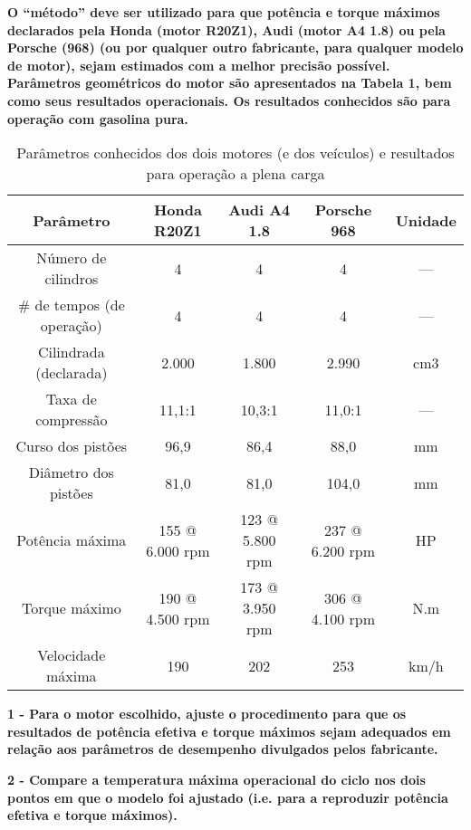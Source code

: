 \documentclass[a4paper]{article}
\begin{document}
\textbf{O “método” deve ser utilizado para que potência e torque máximos declarados pela Honda (motor R20Z1), Audi (motor A4 1.8) ou pela Porsche (968) (ou por qualquer outro fabricante, para qualquer modelo de motor), sejam estimados com a melhor precisão possível. Parâmetros geométricos do motor são apresentados na Tabela 1, bem como seus resultados operacionais. Os resultados conhecidos são para operação com gasolina pura.}
\begin{table}[ht]
    \centering
    \begin{tabular}{|c|c|c|c|c|}
        \hline
    Parâmetro &	Honda R20Z1 & Audi A4 1.8 &	Porsche 968 &	Unidade\\
    \hline
    Número de cilindros &	4 &	4 &	4 &	---\\
    \hline
    \# de tempos (de operação) &	4 &	4 &	4 &	---\\
    \hline
    Cilindrada (declarada) & 2.000 & 1.800 & 2.990 & cm3\\
    \hline
    Taxa de compressão & 11,1:1 & 10,3:1 & 11,0:1 & ---\\
    \hline
    Curso dos pistões &	96,9 & 86,4 & 88,0 & mm\\
    \hline
    Diâmetro dos pistões &	81,0 &	81,0 &	104,0 &	mm\\
    \hline
    Potência máxima & 155 @ 6.000 rpm &	123 @ 5.800 rpm & 237 @ 6.200 rpm &	HP\\
    \hline
    Torque máximo &	190 @ 4.500 rpm & 173 @ 3.950 rpm &	306 @ 4.100 rpm	& N.m\\
    \hline
    Velocidade máxima &	190 & 202 & 253 & km/h\\
    \hline
    \end{tabular}
    \caption{Parâmetros conhecidos dos dois motores (e dos veículos) e resultados para operação a plena carga}
\end{table}

\vspace{3mm}

\textbf{1 - Para o motor escolhido, ajuste o procedimento para que os resultados de potência efetiva e torque máximos sejam adequados em relação aos parâmetros de desempenho divulgados pelos fabricante.}
\vspace{2mm}

\textbf{2 - Compare a temperatura máxima operacional do ciclo nos dois pontos em que o modelo foi ajustado (i.e. para a reproduzir potência efetiva e torque máximos).}
\vspace{2mm}
\end{document}
